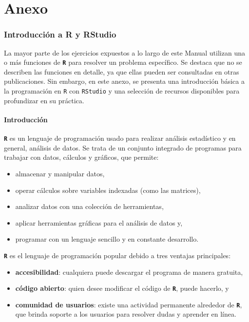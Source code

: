 \documentclass[
]{article}
\begin{document}
\hypertarget{part-anexo}{%
\part{Anexo}\label{part-anexo}}

\hypertarget{anexo}{%
\section{Introducción a R y RStudio}\label{anexo}}

La mayor parte de los ejercicios expuestos a lo largo de este Manual utilizan una o más funciones de \textbf{\texttt{R}} para resolver un problema específico. Se destaca que no se describen las funciones en detalle, ya que ellas pueden ser consultadas en otras publicaciones. Sin embargo, en este anexo, se presenta una introducción básica a la programación en \texttt{R} con \texttt{RStudio} y una selección de recursos disponibles para profundizar en su práctica.

\hypertarget{introR}{%
\subsection{Introducción}\label{introR}}

\textbf{\texttt{R}} es un lenguaje de programación usado para realizar análisis estadístico y en general, análisis de datos. Se trata de un conjunto integrado de programas para trabajar con datos, cálculos y gráficos, que permite:

\begin{itemize}
\item
  almacenar y manipular datos,
\item
  operar cálculos sobre variables indexadas (como las matrices),
\item
  analizar datos con una colección de herramientas,
\item
  aplicar herramientas gráficas para el análisis de datos y,
\item
  programar con un lenguaje sencillo y en constante desarrollo.
\end{itemize}

\textbf{\texttt{R}} es el lenguaje de programación popular debido a tres ventajas principales:

\begin{itemize}
\item
  \textbf{accesibilidad}: cualquiera puede descargar el programa de manera gratuita,
\item
  \textbf{código abierto}: quien desee modificar el código de \textbf{\texttt{R}}, puede hacerlo, y
\item
  \textbf{comunidad de usuarios}: existe una actividad permanente alrededor de \textbf{\texttt{R}}, que brinda soporte a los usuarios para resolver dudas y aprender en línea.
\end{itemize}
\end{document}
